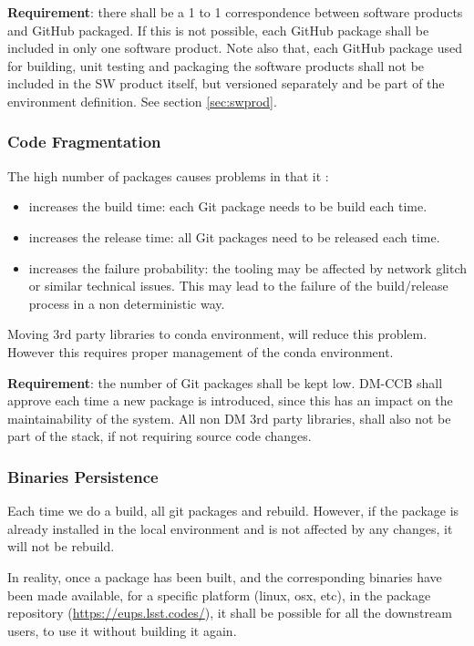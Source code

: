 \textbf{Requirement}: there shall be a 1 to 1 correspondence between software products and GitHub packaged. If this is not possible, each GitHub package shall be included in only one software product.
Note also that, each GitHub package used for building, unit testing and packaging the software products shall not be included in the SW product itself, but versioned separately and be part of the environment definition. See section \ref{sec:swprod}.


\subsubsection{Code Fragmentation} \label{sec:problemCode}

The high number of packages causes problems in that it :

\begin{itemize}
\item increases the build time: each Git package needs to be build each time.
\item increases the release time: all Git packages need to be released each time.
\item increases the failure probability: the tooling may be affected by network glitch or similar technical issues. This may lead to the failure of the build/release process in a non deterministic way.
\end{itemize}

Moving 3rd party libraries to conda environment, will reduce this problem. 
However this requires proper management of the conda environment.

\textbf{Requirement}: the number of Git packages shall be kept low. DM-CCB shall approve each time a new package is introduced, since this has an impact on the maintainability of the system. 
All non DM 3rd party libraries, shall also not be part of the stack, if not requiring source code changes.


\subsubsection{Binaries Persistence} \label{sec:problemPersistence}

Each time we do a build, all git packages and rebuild. However, if the package is already installed in the local environment and is not affected by any changes, it will not be rebuild.

In reality, once a package has been built, and the corresponding binaries have been made available, for a specific platform (linux, osx, etc), in the package repository (\url{https://eups.lsst.codes/}),
it shall be possible for all the downstream users, to use it without building it again.

